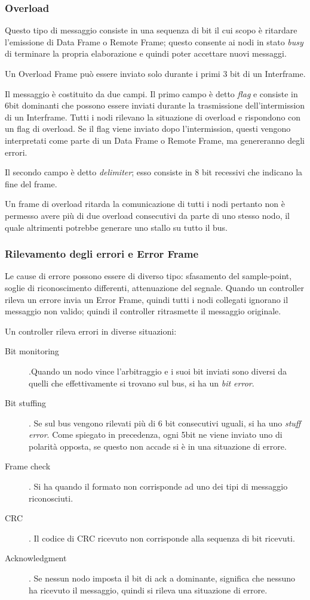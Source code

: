 \documentclass[a4paper,10pt]{book}
\begin{document}
\subsubsection{Overload}
Questo tipo di messaggio consiste in una sequenza di bit il cui scopo
è ritardare l'emissione di Data Frame o Remote Frame; questo consente
ai nodi in stato \textit{busy} di terminare la propria elaborazione e
quindi poter accettare nuovi messaggi.

Un Overload Frame può essere inviato solo durante i primi 3 bit di un
Interframe.

Il messaggio è costituito da due campi. Il primo campo è detto
\textit{flag} e consiste in 6bit dominanti che possono essere inviati
durante la trasmissione dell'intermission di un Interframe. Tutti i
nodi rilevano la situazione di overload e rispondono con un flag di
overload. Se il flag viene inviato dopo l'intermission, questi
vengono interpretati come parte di un Data Frame o Remote Frame, ma
genereranno degli errori.

Il secondo campo è detto \textit{delimiter}; esso consiste in 8 bit
recessivi che indicano la fine del frame.

Un frame di overload ritarda la comunicazione di tutti i nodi
pertanto non è permesso avere più di due overload consecutivi da
parte di uno stesso nodo, il quale altrimenti potrebbe generare uno
stallo su tutto il bus.

\subsubsection{Rilevamento degli errori e Error Frame}
Le cause di errore possono essere di diverso tipo: sfasamento del
sample-point, soglie di riconoscimento differenti, attenuazione del
segnale. Quando un controller rileva un errore invia un Error Frame,
quindi tutti i nodi collegati ignorano il messaggio non valido;
quindi il controller ritrasmette il messaggio originale.

Un controller rileva errori in diverse situazioni:
\begin{description}
 \item[Bit monitoring].Quando un nodo vince l'arbitraggio e i suoi bit
inviati sono diversi da quelli che effettivamente si trovano
sul bus, si ha un \textit{bit error}.
 \item[Bit stuffing]. Se sul bus vengono rilevati più di 6 bit
consecutivi uguali, si ha uno \textit{stuff error}. Come spiegato in
precedenza, ogni 5bit ne viene inviato uno di polarità opposta, se
questo non accade si è in una situazione di errore.
 \item[Frame check]. Si ha quando il formato non corrisponde ad uno
dei tipi di messaggio riconosciuti.
 \item[CRC]. Il codice di CRC ricevuto non corrisponde alla sequenza
di bit ricevuti.
 \item[Acknowledgment]. Se nessun nodo imposta il bit di ack a
dominante, significa che nessuno ha ricevuto il messaggio, quindi si
rileva una situazione di errore.
\end{description}
\end{document}
